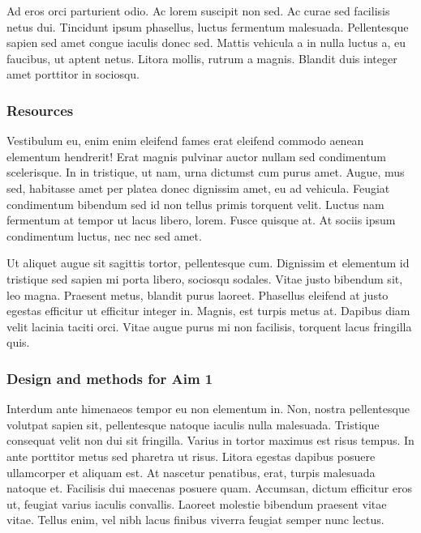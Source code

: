 \documentclass[11pt,]{article}
\begin{document}
Ad eros orci parturient odio. Ac lorem suscipit non sed. Ac curae sed
facilisis netus dui. Tincidunt ipsum phasellus, luctus fermentum
malesuada. Pellentesque sapien sed amet congue iaculis donec sed. Mattis
vehicula a in nulla luctus a, eu faucibus, ut aptent netus. Litora
mollis, rutrum a magnis. Blandit duis integer amet porttitor in
sociosqu.

\hypertarget{resources}{%
\subsubsection{Resources}\label{resources}}

Vestibulum eu, enim enim eleifend fames erat eleifend commodo aenean
elementum hendrerit! Erat magnis pulvinar auctor nullam sed condimentum
scelerisque. In in tristique, ut nam, urna dictumst cum purus amet.
Augue, mus sed, habitasse amet per platea donec dignissim amet, eu ad
vehicula. Feugiat condimentum bibendum sed id non tellus primis torquent
velit. Luctus nam fermentum at tempor ut lacus libero, lorem. Fusce
quisque at. At sociis ipsum condimentum luctus, nec nec sed amet.

Ut aliquet augue sit sagittis tortor, pellentesque cum. Dignissim et
elementum id tristique sed sapien mi porta libero, sociosqu sodales.
Vitae justo bibendum sit, leo magna. Praesent metus, blandit purus
laoreet. Phasellus eleifend at justo egestas efficitur ut efficitur
integer in. Magnis, est turpis metus at. Dapibus diam velit lacinia
taciti orci. Vitae augue purus mi non facilisis, torquent lacus
fringilla quis.

\hypertarget{design-and-methods-for-aim-1}{%
\subsubsection{Design and methods for Aim
1}\label{design-and-methods-for-aim-1}}

Interdum ante himenaeos tempor eu non elementum in. Non, nostra
pellentesque volutpat sapien sit, pellentesque natoque iaculis nulla
malesuada. Tristique consequat velit non dui sit fringilla. Varius in
tortor maximus est risus tempus. In ante porttitor metus sed pharetra ut
risus. Litora egestas dapibus posuere ullamcorper et aliquam est. At
nascetur penatibus, erat, turpis malesuada natoque et. Facilisis dui
maecenas posuere quam. Accumsan, dictum efficitur eros ut, feugiat
varius iaculis convallis. Laoreet molestie bibendum praesent vitae
vitae. Tellus enim, vel nibh lacus finibus viverra feugiat semper nunc
lectus.
\end{document}
